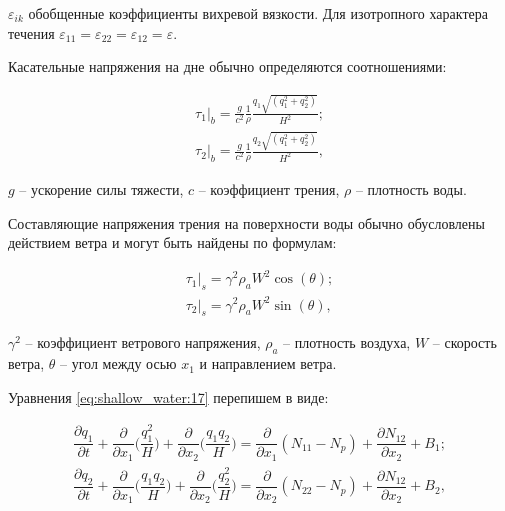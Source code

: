 \documentclass[14pt]{extreport}
\begin{document}
 $\varepsilon_{ik}$ обобщенные коэффициенты вихревой вязкости. Для изотропного характера течения $\varepsilon_{11}=\varepsilon_{22}=\varepsilon_{12}=\varepsilon.$

Касательные напряжения на дне обычно определяются соотношениями:

\begin{equation}\label{eq:shallow_water:20}
\begin{aligned}
\tau_1\bigg|_b = \frac{g}{c^2} \frac{1}{\rho} \frac{q_1\sqrt{(q_1^2+q_2^2)}}{H^2}; \\
\tau_2\bigg|_b = \frac{g}{c^2} \frac{1}{\rho} \frac{q_2\sqrt{(q_1^2+q_2^2)}}{H^2},
\end{aligned}
\end{equation}

 $g$ -- ускорение силы тяжести, $c$ -- коэффициент трения, $\rho$ -- плотность воды. 

Составляющие напряжения трения на поверхности воды обычно обусловлены действием ветра и могут быть найдены по формулам:

\begin{equation}\label{eq:shallow_water:21}
\begin{aligned}
\tau_1\bigg|_s=\gamma^2\rho_aW^2\cos(\theta);\\
\tau_2\bigg|_s=\gamma^2\rho_aW^2\sin(\theta),
\end{aligned}
\end{equation}

 $\gamma^2$ -- коэффициент ветрового напряжения, $\rho_a$ -- плотность воздуха, $W$ -- скорость ветра, $\theta$ -- угол между осью $x_1$ и направлением ветра.

Уравнения \ref{eq:shallow_water:17} перепишем в виде:


\begin{equation}\label{eq:shallow_water:22}
\begin{aligned}
\dfrac{\partial q_1}{\partial t} + \dfrac{\partial}{\partial x_1} \bigg(\dfrac{q_1^2}{H}\bigg)+\dfrac{\partial }{\partial x_2}\bigg(\dfrac{q_1 q_2}{H}\bigg) = \dfrac{\partial}{\partial x_1} (N_{11}-N_p) + \dfrac{\partial N_{12}}{\partial x_2} + B_1; \\
\dfrac{\partial q_2}{\partial t} + \dfrac{\partial}{\partial x_1} \bigg(\dfrac{q_1 q_2}{H}\bigg)+\dfrac{\partial }{\partial x_2}\bigg(\dfrac{q_2^2}{H}\bigg) = \dfrac{\partial}{\partial x_2} (N_{22}-N_p) + \dfrac{\partial N_{12}}{\partial x_2} + B_2,
\end{aligned}
\end{equation}
\end{document}
